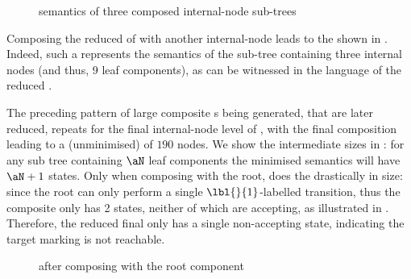 
\begin{figure}[ht]
    \centering
    \caption{\TNFA{} semantics of three composed internal-node sub-trees}
    \label{fig:threeInternalNodeSubtreesTNFA}
\end{figure}

Composing the reduced \TNFA{} of 
with another internal-node \TNFA{} leads to the \TNFA{} shown in
. Indeed, such a \TNFA{} represents the
semantics of the sub-tree containing three internal nodes (and thus, 9 leaf
components), as can be witnessed in the language of the reduced \TNFA{}.

The preceding pattern of large composite \TNFA{}s being generated, that are
later reduced, repeats for the final internal-node level of ,
with the final composition leading to a (unminimised) \TNFA{} of $190$ nodes.
We show the intermediate \TNFA{} sizes in : for
any sub tree containing $\aN$ leaf components the minimised \TNFA{} semantics
will have $\aN + 1$ states. Only when composing with the root, does the \TNFA{}
drastically in size: since the root can only perform a single
$\lbl{}{1}$-labelled transition, thus the composite \TNFA{} only has 2 states,
neither of which are accepting, as illustrated in
. Therefore, the reduced final \TNFA{} only has a
single non-accepting state, indicating the target marking is not reachable.

\begin{figure}[ht]
    \centering
    \caption{\TNFA{} after composing with the root component}
    \label{fig:TNFARootComposed}
\end{figure}

